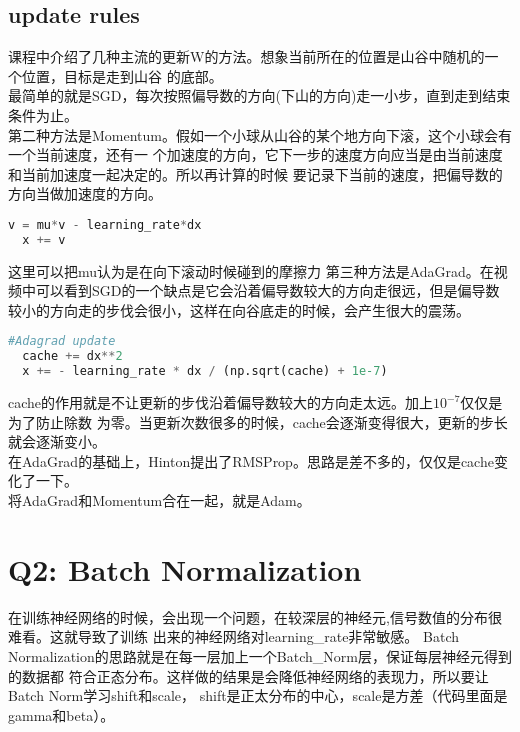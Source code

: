 \documentclass{ctexart}
\begin{document}
\begin{flushleft}
\subsection{update rules}
课程中介绍了几种主流的更新W的方法。想象当前所在的位置是山谷中随机的一个位置，目标是走到山谷
的底部。\\
最简单的就是SGD，每次按照偏导数的方向(下山的方向)走一小步，直到走到结束条件为止。\\
第二种方法是Momentum。假如一个小球从山谷的某个地方向下滚，这个小球会有一个当前速度，还有一
个加速度的方向，它下一步的速度方向应当是由当前速度和当前加速度一起决定的。所以再计算的时候
要记录下当前的速度，把偏导数的方向当做加速度的方向。
\begin{lstlisting}[language=python]
  v = mu*v - learning_rate*dx
  x += v
\end{lstlisting}
这里可以把mu认为是在向下滚动时候碰到的摩擦力
第三种方法是AdaGrad。在视频中可以看到SGD的一个缺点是它会沿着偏导数较大的方向走很远，但是偏导数
较小的方向走的步伐会很小，这样在向谷底走的时候，会产生很大的震荡。
\begin{lstlisting}[language=python]
  #Adagrad update
  cache += dx**2
  x += - learning_rate * dx / (np.sqrt(cache) + 1e-7)
\end{lstlisting}
cache的作用就是不让更新的步伐沿着偏导数较大的方向走太远。加上$10^{-7}$仅仅是为了防止除数
为零。当更新次数很多的时候，cache会逐渐变得很大，更新的步长就会逐渐变小。\\
在AdaGrad的基础上，Hinton提出了RMSProp。思路是差不多的，仅仅是cache变化了一下。\\
将AdaGrad和Momentum合在一起，就是Adam。


\section{Q2: Batch Normalization}

在训练神经网络的时候，会出现一个问题，在较深层的神经元,信号数值的分布很难看。这就导致了训练
出来的神经网络对learning\_rate非常敏感。
Batch Normalization的思路就是在每一层加上一个Batch\_Norm层，保证每层神经元得到的数据都
符合正态分布。这样做的结果是会降低神经网络的表现力，所以要让Batch Norm学习shift和scale，
shift是正太分布的中心，scale是方差（代码里面是gamma和beta）。

\end{flushleft}
\end{document}
